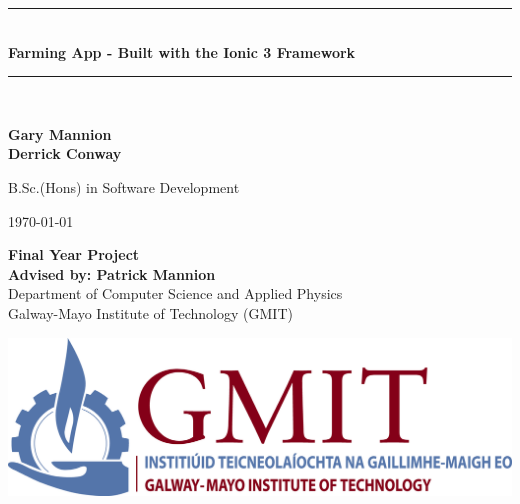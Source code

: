 \documentclass[12pt,a4paper,oneside,openany]{book}
\begin{document}
\begin{titlepage}
\newcommand{\HRule}{\rule{\linewidth}{0.1mm}} 
\center %


\HRule \\[0.4cm]
{ \huge \bfseries Farming App - Built with the Ionic 3 Framework}\\[0.1cm] %
\HRule \\[1.5cm]

 \begin{center}
    {\Large
      \textbf {Gary Mannion}
    }\\
    \vspace{0.2cm}
    {\Large
     \textbf {Derrick Conway}
    }
  \end{center}
  
  \begin{center}
      B.Sc.(Hons) in Software Development
  \end{center}
  
  \vfill

{\large \today}\\[.75cm] %

\begin{center}
    {\large
    \textbf {Final Year Project} \\[0.1cm]
    }
  \textbf {Advised by: Patrick Mannion} \\[0.1cm]
      Department of Computer Science and Applied Physics\\
      Galway-Mayo Institute of Technology (GMIT)    
\end{center}
  
\begin{center}
\includegraphics[width=1.0\textwidth]{Images/gmitlogo.jpg} \\

\end{center}
\end{titlepage}

\newpage
\tableofcontents
\end{document}
